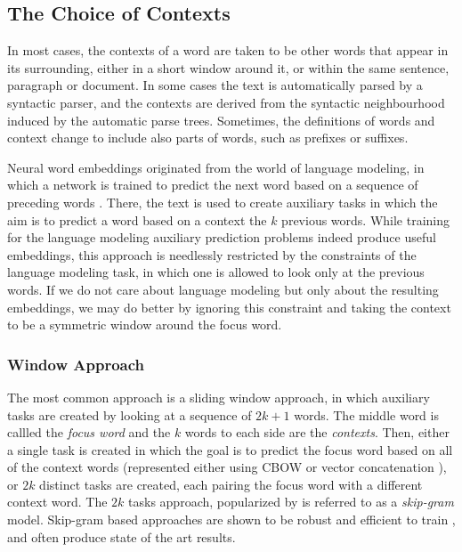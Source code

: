 \documentclass[jair,twoside,11pt,theapa]{article}
\begin{document}
{\subsection{The Choice of Contexts}

In most cases, the contexts of a word are taken to be other words that appear in
its surrounding, either in a short window around it, or within the same
sentence, paragraph or document. In some cases the text is automatically parsed
by a syntactic parser, and the contexts are derived from the syntactic
neighbourhood induced by the automatic parse trees. Sometimes, the definitions
of words and context change to include also parts of words, such as prefixes or
suffixes.

Neural word embeddings originated from the world of language modeling, in which
a network is trained to predict the next word based on a sequence of preceding
words \cite{bengio2003neural}. There, the text is used to create auxiliary tasks in
which the aim is to predict a word based on a context the $k$ previous words.
While training for the language modeling auxiliary prediction problems indeed
produce useful embeddings, this approach is needlessly restricted by the
constraints of the language modeling task, in which one is allowed to look only
at the previous words.
If we do not care about language modeling but only about the resulting
embeddings, we may do better by ignoring this constraint and taking the context
to be a symmetric window around the focus word.

\subsubsection{Window Approach} The most common approach is a sliding window
approach, in which auxiliary tasks are created by looking at a sequence of
$2k+1$ words. The middle word is callled the \emph{focus word} and the $k$ words
to each side are the \emph{contexts}.  Then, either a single task is created in
which the goal is to predict the focus word based on all of the context words
(represented either using CBOW \cite{mikolov2013efficient} or vector concatenation
\cite{collobert2008unified}), or $2k$ distinct tasks are created, each pairing the focus
word with a different context word. The $2k$ tasks approach, popularized by
\cite{mikolov2013distributed} is referred to as a \emph{skip-gram} model.  Skip-gram
based approaches are shown to be robust and efficient to train
\cite{mikolov2013distributed,pennington2014glove}, and often produce state of the art results. 

}
\end{document}

